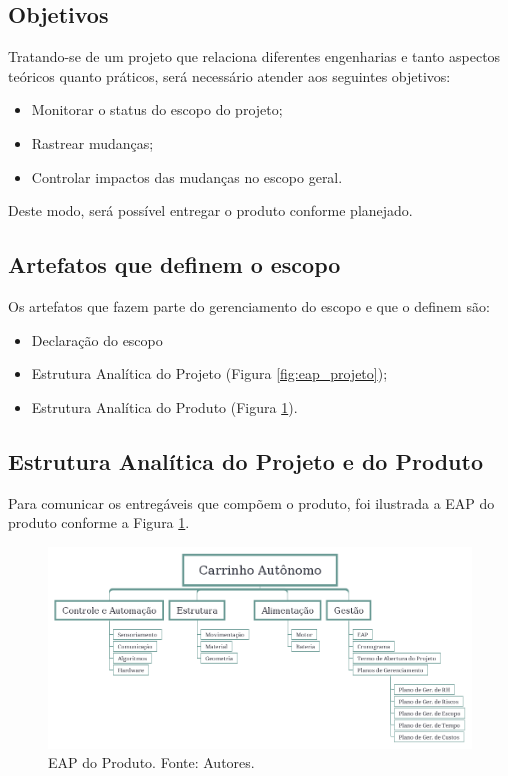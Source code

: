 \subsection{Objetivos}

Tratando-se de um projeto que relaciona diferentes engenharias e tanto aspectos teóricos quanto práticos, será necessário atender aos seguintes objetivos:

\begin{itemize}
\item Monitorar o status do escopo do projeto;
\item Rastrear mudanças;
\item Controlar impactos das mudanças no escopo geral.
\end{itemize}

Deste modo, será possível entregar o produto conforme planejado.

\subsection{Artefatos que definem o escopo}
Os artefatos que fazem parte do gerenciamento do escopo e que o definem são:

\begin{itemize}
\item Declaração do escopo %
\item Estrutura Analítica do Projeto (Figura \ref{fig:eap_projeto});
\item Estrutura Analítica do Produto (Figura \ref{fig:eap_produto}).
\end{itemize}

\subsection{Estrutura Analítica do Projeto e do Produto}

Para comunicar os entregáveis que compõem o produto, foi ilustrada a EAP do produto conforme a Figura \ref{fig:eap_produto}.

\begin{figure}[htpb!]
    \centering
    \includegraphics[scale= 0.5]{figuras/eap_produto.png}
    \caption{EAP do Produto. Fonte: Autores.}
    \label{fig:eap_produto}
\end{figure}

